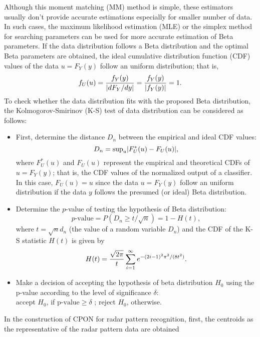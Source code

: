 \documentclass[runningheads,a4paper]{llncs}
\begin{document}
Although this moment matching (MM) method is simple, these estimators usually don't provide accurate estimations especially for smaller number of data.
In such cases, the maximum likelihood estimation (MLE) or the simplex method for searching parameters \cite{Abo94} can be used for 
more accurate estimation of Beta parameters. If the data distribution follows a Beta distribution and the optimal Beta parameters are obtained, 
the ideal cumulative distribution function (CDF) values of the data $u=F_Y(y)$ follow an uniform distribution; that is,
\begin{equation}
f_U(u)={{f_Y(y)}\over{|dF_Y/dy|}}={{f_Y(y)}\over{|f_Y(y)|}}=1.
\end{equation}
To check whether the data distribution fits with the proposed Beta distribution,
the Kolmogorov-Smirinov (K-S) test \cite{Roh01} of data distribution can be considered as follows:
\begin{itemize}
\item First, determine the distance  $D_n$ between the empirical and ideal CDF values:
\begin{equation}
D_n = {\rm sup}_u|F_U^*(u)-F_U(u)|,
\end{equation}
where $F_U^*(u)$ and $F_U(u)$ represent the empirical and theoretical CDFs of $u=F_Y(y)$; that is,
the CDF values of the normalized output of a classifier. In this case, $F_U(u)=u$ since
the data $u=F_Y(y)$ follow an uniform distribution if the data $y$ follows the presumed (or ideal) Beta distribution.
\item Determine the $p$-value of testing the hypothesis of Beta distribution:
\begin{equation}
\mbox{$p$-value}=P(D_n\ge t/\sqrt{n})=1-H(t),
\label{p_val}
\end{equation}		
where $t=\sqrt{n} d_n$ (the value of a random variable $D_n$) and the CDF of the K-S statistic $H(t)$ is given by
\begin{equation}
H(t)={{\sqrt{2\pi}}\over t}\sum_{i=1}^\infty e^{-(2i-1)^2\pi^2/(8t^2)}.
\end{equation}
\item Make a decision of accepting the hypothesis of beta distribution $H_0$ using
the p-value according to the level of significance $\delta$:\\
accept $H_0$, if $\mbox{p-value}\ge \delta$ ; reject $H_0$, otherwise.
\end{itemize}
In the construction of CPON for radar pattern recognition, first, the centroids as the representative of the radar pattern data are obtained 
\end{document}

